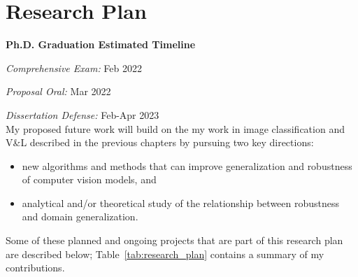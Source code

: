 \chapter{Research Plan}
\label{chap:proposed}
\noindent\textbf{Ph.D. Graduation Estimated Timeline}

\quad\textit{Comprehensive Exam:} Feb 2022

\quad\textit{Proposal Oral:} Mar 2022

\quad\textit{Dissertation Defense:} Feb-Apr 2023\\


\noindent My proposed future work will build on the my work in image classification and V\&L described in the previous chapters by pursuing two key directions:
\begin{itemize}
    \item new algorithms and methods that can improve generalization and robustness of computer vision models, and
    \item analytical and/or theoretical study of the relationship between robustness and domain generalization.
\end{itemize}

\noindent Some of these planned and ongoing projects that are part of this research plan are described below; Table~\ref{tab:research_plan} contains a summary of my contributions.


